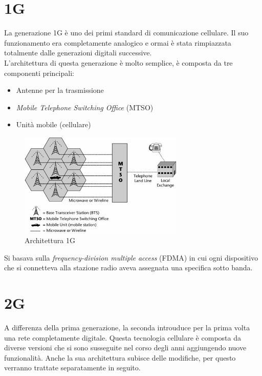 \section{1G}
La generazione 1G è uno dei primi standard di comunicazione cellulare. Il suo funzionamento era completamente analogico 
e ormai è stata rimpiazzata totalmente dalle generazioni digitali successive.\\
L'architettura di questa generazione è molto semplice, è composta da tre componenti principali:
\begin{itemize}
    \item Antenne per la trasmissione
    \item \textit{Mobile Telephone Switching Office} (MTSO)
    \item Unità mobile (cellulare)
\end{itemize}
\begin{figure}[ht]
    \centering
    \includegraphics[width=0.7\textwidth]{images/1g.jpg}
    \caption{Architettura 1G}
\end{figure}
Si basava sulla \textit{frequency-division multiple access} (FDMA) in cui ogni dispositivo che si connetteva alla stazione radio
aveva assegnata una specifica sotto banda\cite{generations}.

\clearpage

\section{2G}
A differenza della prima generazione, la seconda introuduce per la prima volta una rete completamente digitale.
Questa tecnologia cellulare è composta da diverse versioni che si sono susseguite nel corso degli anni aggiungendo nuove 
funzionalità.
Anche la sua architettura subisce delle modifiche, per questo verranno trattate separatamente in seguito.
